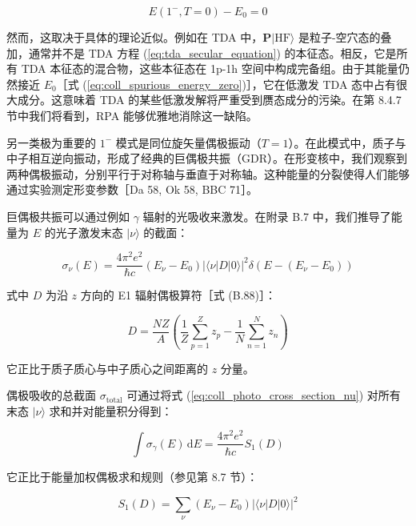 \begin{equation}
E(1^{-},T=0)-E_{0}=0\label{eq:coll_spurious_energy_zero}
\end{equation}

然而，这取决于具体的理论近似。例如在 TDA 中，$\boldsymbol{P}|\text{HF}\rangle$ 是粒子-空穴态的叠加，通常并不是
TDA 方程 (\ref{eq:tda_secular_equation}) 的本征态。相反，它是所有 TDA 本征态的混合物，这些本征态在
1p-1h 空间中构成完备组。由于其能量仍然接近 $E_{0}$［式 (\ref{eq:coll_spurious_energy_zero})］，它在低激发
TDA 态中占有很大成分。这意味着 TDA 的某些低激发解将严重受到赝态成分的污染。在第 8.4.7 节中我们将看到，RPA 能够优雅地消除这一缺陷。

另一类极为重要的 $1^{-}$ 模式是同位旋矢量偶极振动（$T=1$）。在此模式中，质子与中子相互逆向振动，形成了经典的巨偶极共振（GDR）。在形变核中，我们观察到两种偶极振动，分别平行于对称轴与垂直于对称轴。这种能量的分裂使得人们能够通过实验测定形变参数［Da
58, Ok 58, BBC 71］。

巨偶极共振可以通过例如 $\gamma$ 辐射的光吸收来激发。在附录 B.7 中，我们推导了能量为 $E$ 的光子激发末态 $|\nu\rangle$
的截面：

\begin{equation}
\sigma_{\nu}(E)=\frac{4\pi^{2}e^{2}}{\hbar c}(E_{\nu}-E_{0})|\langle\nu|D|0\rangle|^{2}\delta(E-(E_{\nu}-E_{0}))\label{eq:coll_photo_cross_section_nu}
\end{equation}

式中 $D$ 为沿 $z$ 方向的 E1 辐射偶极算符［式 (B.88)］：

\begin{equation}
D=\frac{NZ}{A}\left(\frac{1}{Z}\sum^{Z}_{p=1}z_{p}-\frac{1}{N}\sum^{N}_{n=1}z_{n}\right)\label{eq:coll_dipole_operator_relative}
\end{equation}

它正比于质子质心与中子质心之间距离的 $z$ 分量。

偶极吸收的总截面 $\sigma_{\text{total}}$ 可通过将式 (\ref{eq:coll_photo_cross_section_nu})
对所有末态 $|\nu\rangle$ 求和并对能量积分得到：

\begin{equation}
\int\sigma_{\gamma}(E)\,\mathrm{d}E=\frac{4\pi^{2}e^{2}}{\hbar c}S_{1}(D)\label{eq:coll_integrated_cross_section}
\end{equation}

它正比于能量加权偶极求和规则（参见第 8.7 节）：

\begin{equation}
S_{1}(D)=\sum_{\nu}(E_{\nu}-E_{0})|\langle\nu|D|0\rangle|^{2}\label{eq:coll_energy_weighted_sum_rule_def}
\end{equation}

